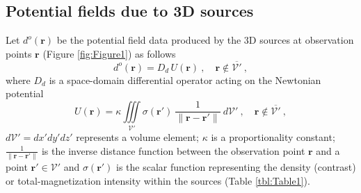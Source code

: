 \subsection{Potential fields due to 3D sources}
\label{sec:potential_fields_3D_sources}


Let $d^{o}(\mathbf{r})$ be the potential field data produced by the 3D sources at observation points 
$\mathbf{r}$ (Figure \ref{fig:Figure1}) as follows
\begin{equation}
	d^{o}(\mathbf{r}) = D_{d} \, U(\mathbf{r}) \: , 
	\quad \mathbf{r} \notin \overline{\mathcal{V}'} \: ,
	\label{eq:observed-data-space}
\end{equation}
where $D_{d}$ is a space-domain differential operator acting on the Newtonian potential
\begin{equation}
	U(\mathbf{r}) = \kappa \iiint\limits_{\mathcal{V}'}
	\sigma(\mathbf{r}') \: \frac{1}{\| \mathbf{r} - \mathbf{r}'\|}
	\: d\mathcal{V}' \: , 
	\quad \mathbf{r} \notin \overline{\mathcal{V}'} \: ,
	\label{eq:potential-U-space}
\end{equation}
$d\mathcal{V}' = dx'dy'dz'$ represents a volume element;
$\kappa$ is a proportionality constant;
$\tfrac{1}{\| \mathbf{r} - \mathbf{r}' \|}$ is the inverse distance function
between the observation point $\mathbf{r}$ and a point $\mathbf{r}' \in \mathcal{V}'$
and $\sigma(\mathbf{r}')$ is the scalar function representing 
the density (contrast) or total-magnetization intensity within the sources (Table \ref{tbl:Table1}).

